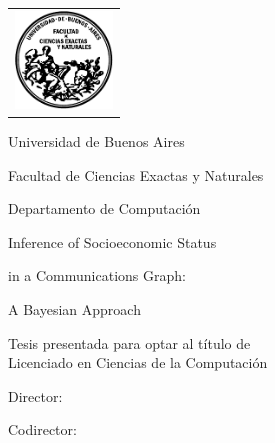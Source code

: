 \makeatletter

\newcommand{\HRule}{\rule{\linewidth}{0.2mm}}
%
\thispagestyle{empty}

\begin{center}\leavevmode

\vspace{-2cm}

\begin{tabular}{l}
\includegraphics[width=2.6cm]{template_tesis/logofcen.pdf}
\end{tabular}

{\large \sc Universidad de Buenos Aires}

{\large \sc Facultad de Ciencias Exactas y Naturales}

{\large \sc Departamento de Computaci\'on}

\vspace{4.0cm}

\begin{mdseries}
{\huge Inference of Socioeconomic Status}

{\huge in a Communications Graph:}

{\huge A Bayesian Approach}
\end{mdseries}

\vspace{2cm}

{\large Tesis presentada para optar al título de \\ Licenciado en Ciencias de la Computación}

\vspace{2cm}

{\Large \@author}

\end{center}

\vfill

{\large {Director: \director}}

\vspace{.2cm}

{\large {Codirector: \codirector}}

\vspace{.2cm}

{\large {\@date}}

\makeatother

\newpage\thispagestyle{empty}

